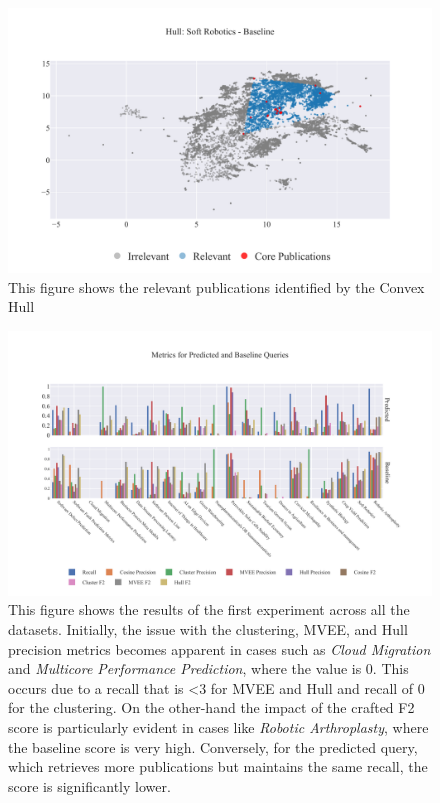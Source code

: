\documentclass[%
  a4paper,fontsize=11pt,abstract=on,%
  oneside,BCOR=19mm,%
]{scrreprt}
\begin{document}
\begin{figure}
	\centering	
	\includegraphics[scale=0.7]{pics/sr-hull-baseline.pdf}
	\caption[Semantic Cosine Threshold: Empirical Analysis]{This figure shows the relevant publications identified by the Convex Hull}\label{fig:sr-hull-baseline}
\end{figure}

\begin{figure}
	\centering	
	\includegraphics[scale=0.7]{pics/all-metrics-1.pdf}
	\caption[Evaluation: Experiment 1]{This figure shows the results of the first experiment across all the datasets. Initially, the issue with the clustering, MVEE, and Hull precision metrics becomes apparent in cases such as \textit{Cloud Migration} and \textit{Multicore Performance Prediction}, where the value is 0. This occurs due to a recall that is <3 for MVEE and Hull and recall of 0 for the clustering. On the other-hand the impact of the crafted F2 score is particularly evident in cases like \textit{Robotic Arthroplasty}, where the baseline score is very high. Conversely, for the predicted query, which retrieves more publications but maintains the same recall, the score is significantly lower.}\label{fig:all-metrics-1}
\end{figure}
\end{document}
